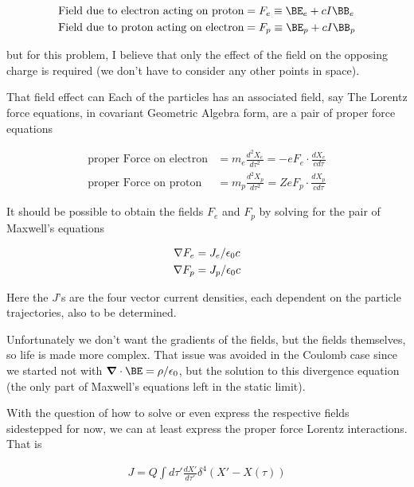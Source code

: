 \begin{align}\label{eqn:nuclearInteraction:hoo3}
\text{Field due to electron acting on proton} &= F_e \equiv \BE_e + c I\BB_e \\
\text{Field due to proton acting on electron} &= F_p \equiv \BE_p + c I\BB_p
\end{align}

but for this problem, I believe that only the effect of the field on the opposing charge is required (we don't have to consider any other points in space).

That field effect 
can Each of the particles has an associated field, say
The Lorentz force equations, in covariant Geometric Algebra form, are a pair of proper force equations

\begin{align}\label{eqn:nuclearInteraction:hoo6}
\text{proper Force on electron} &= m_e \frac{d^2 X_e}{d\tau^2} = - e F_e \cdot \frac{d X_e}{c d\tau} \\
\text{proper Force on proton} &= m_p \frac{d^2 X_p}{d\tau^2} = Z e F_p \cdot \frac{d X_p}{c d\tau}
\end{align}


It should be possible to obtain the fields $F_e$ and $F_p$ by solving for the pair of Maxwell's equations

\begin{align}\label{eqn:nuclearInteraction:hoo4}
\nabla F_e &= J_e/\epsilon_0 c \\
\nabla F_p &= J_p/\epsilon_0 c
\end{align}

Here the $J$'s are the four vector current densities, each dependent on the particle trajectories, also to be determined.

Unfortunately we don't want the gradients of the fields, but the fields themselves, so life is made more complex.  That issue was avoided in the Coulomb case since we started not with $\spacegrad \cdot \BE = \rho/\epsilon_0$, but the solution to this divergence equation (the only part of Maxwell's equations left in the static limit).





With the question of how to solve or even express the respective fields sidestepped for now, we can at least express the proper force Lorentz interactions.  That is

\begin{align}\label{eqn:nuclearInteraction:hoo5}
J = Q \int d\tau' \frac{dX'}{d\tau'} \delta^4 (X' - X(\tau))
\end{align}



